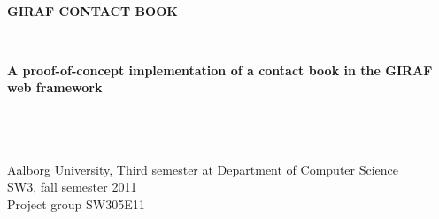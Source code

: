 \thispagestyle{empty}
\begin{center}
	\hrulefill\newline
	\\
	\begin{LARGE}	
	\textbf{GIRAF CONTACT BOOK}
	\end{LARGE}
	\\
	\begin{large} 
	\textbf{A proof-of-concept implementation of a contact book in the GIRAF web framework}
	\end{large}\\
	\hrulefill\newline
	\\~\\
	Aalborg University, Third semester at Department of Computer Science \\
	SW3, fall semester 2011	\\
	Project group SW305E11\\
\end{center}